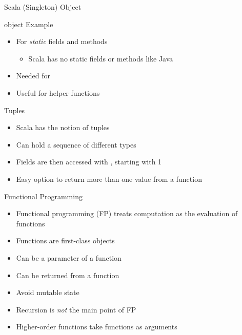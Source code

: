 \begin{frame}[fragile]{Scala (Singleton) Object}
\begin{chisel}
object Example {}
\end{chisel}
\begin{itemize}
\item For \emph{static} fields and methods
\begin{itemize}
\item Scala has no static fields or methods like Java
\end{itemize}
\item Needed for 
\item Useful for helper functions
\end{itemize}
\end{frame}

\begin{frame}[fragile]{Tuples}
\begin{itemize}
\item Scala has the notion of tuples
\item Can hold a sequence of different types
\item Fields are then accessed with , starting with 1
\item Easy option to return more than one value from a function
\end{itemize}
\end{frame}



\begin{frame}[fragile]{Functional Programming}
\begin{itemize}
\item Functional programming (FP) treats computation as the evaluation of functions
\item Functions are first-class objects
\item Can be a parameter of a function
\item Can be returned from a function
\item Avoid mutable state
\item Recursion is \emph{not} the main point of FP
\item Higher-order functions take functions as arguments
\end{itemize}
\end{frame}


